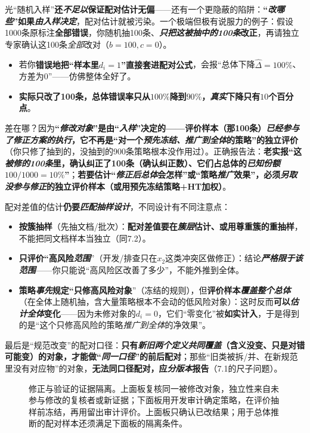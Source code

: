 光“随机入样”\textbf{还\emph{不足以}保证配对估计无偏}——还有一个更隐蔽的陷阱：\textbf{“\emph{改哪些}”如果\emph{由入样决定}}，配对估计就被污染。一个极端但极有说服力的例子：假设1000条原标注\textbf{全部错误}，你随机抽100条、\textbf{\emph{只把这被抽中的100条}改正}，再请独立专家确认这100条\emph{全部}改对（$b=100,c=0$）。
\begin{itemize}\item 若你\textbf{错误地把“样本里$d_i=1$”直接套进配对公式}，会报“总体下降$\widehat\Delta=100\%$、方差为0”——仿佛整体全好了。\item \textbf{实际只改了100条，总体错误率只从$100\%$降到$90\%$，\emph{真实}下降只有$10$个百分点}。\end{itemize}
差在哪？因为\textbf{“\emph{修改对象}”是由“\emph{入样}”决定的——\textbf{评价样本（那100条）\emph{已经参与了修正方案的执行}}，它不再是“对一个\emph{预先冻结、推广到全体}的策略”的独立评价}（你只修了抽到的，没抽到的900条策略根本没作用过）。正确报告法：\textbf{老实报“这\emph{被修的100条}里，确认纠正了100条（确认纠正数）、它们占总体的\emph{已知份额}$100/1000=10\%$”}；\textbf{若要估计“\emph{修正后总体}会怎样”或“策略\emph{推广}效果”，必须\emph{另取}\emph{没参与修正}的独立评价样本（或用预先冻结策略+HT加权）}。

配对差值的估计\textbf{仍要\emph{匹配抽样设计}}，不同设计有不同注意点：
\begin{itemize}\item \textbf{按簇抽样}（先抽文档/批次）：\textbf{配对差值要在\emph{簇层}估计、或用尊重簇的重抽样}，不能把同文档样本当独立（同7.2）。\item \textbf{只评价“高风险\emph{范围}}”（开发/排查只在$x_2$这类冲突区做修正）：结论\textbf{\emph{严格限于该范围}}——你只能说“高风险区改善了多少”，不能外推到全体。\item \textbf{策略\emph{事先}规定“只修高风险对象}”（冻结的规则），但\textbf{评价样本\emph{覆盖整个总体}}（在全体上随机抽，含大量策略根本不会动的低风险对象）：这时反而\textbf{可以\emph{估计全体}变化}——因为未修对象的$d_i=0$，它们“零变化”被\textbf{如实计入}，于是得到的是“这个只修高风险的策略\emph{推广到全体}的净效果”。\end{itemize}
最后是“规范改变”的配对口径：\textbf{只有\emph{新旧两个定义\emph{共同覆盖}}（含义没变、只是对错可能变）的对象，才能做“\emph{同一口径}”的前后配对}；那些“旧类被拆/并、在新规范里没有对应物”的对象，\textbf{无法同口径配对，应\emph{分版本}报告}（7.1的尺子问题）。

\begin{figure}[htbp]
  \centering
  
  \caption{修正与验证的证据隔离。上面板复核同一被修改对象，独立性来自未参与修改的复核者或新证据；下面板用开发审计确定策略，在评价抽样前冻结，再用留出审计评价。上面板只确认已改结果；用于总体推断的配对样本还须满足下面板的隔离条件。}
  \label{fig:knowledge-quality-assessment-correction-evidence-isolation}
\end{figure}


